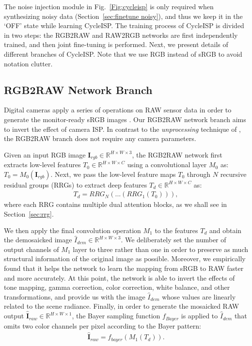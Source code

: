 \documentclass[10pt,twocolumn,letterpaper]{article}
\begin{document}
The noise injection module in Fig.~\ref{Fig:cycleisp} is only required when synthesizing noisy data (Section~\ref{sec:finetune noisy}), and thus we keep it in the `OFF' state while learning CycleISP. 
The training process of CycleISP is divided in two steps: the RGB2RAW and RAW2RGB networks are first independently trained, and then joint fine-tuning is performed. 
Next, we present details of different branches of CycleISP. 
Note that we use RGB instead of sRGB to avoid notation clutter.

\subsection{RGB2RAW Network Branch}
Digital cameras apply a series of operations on RAW sensor data in order to generate the monitor-ready sRGB images \cite{Ramanath2005}. 
Our RGB2RAW network branch aims to invert the effect of camera ISP. 
In contrast to the \emph{unprocessing} technique of \cite{Brooks2019}, the RGB2RAW branch does not require any camera parameters.  

Given an input RGB image $\mathbf{I}_{rgb} \in \mathbb{R}^{H\times W \times 3}$, the RGB2RAW network first extracts low-level features $T_0\in \mathbb{R}^{H\times W \times C}$ using a convolutional layer $M_0$ as: $T_0 = M_0(\mathbf{I}_{rgb}).$ 
Next, we pass the low-level feature maps $T_0$ through $N$ recursive residual groups (RRGs) to extract deep features $T_d \in \mathbb{R}^{H\times W \times C}$ as:
\begin{align}
T_d = RRG_{N}\left(...(RRG_1(T_0))\right),
\label{Eq:rrg}
\end{align}
where each RRG contains multiple dual attention blocks, as we shall see in Section~\ref{sec:rrg}. 

We then apply the final convolution operation $M_1$ to the features $T_d$ and obtain the demosaicked image $\hat{I}_{dem} \in \mathbb{R}^{H\times W \times 3}$.
We deliberately set the number of output channels of $M_1$ layer to three rather than one in order to preserve as much structural information of the original image as possible. 
Moreover, we empirically found that it helps the network to learn the mapping from sRGB to RAW faster and more accurately. 
At this point, the network is able to invert the effects of tone mapping, gamma correction, color correction, white balance, and other transformations, and provide us with the image $\hat{I}_{dem}$ whose values are linearly related to the scene radiance. 
Finally, in order to generate the mosaicked RAW output $\hat{\mathbf{I}}_{raw}\in \mathbb{R}^{H\times W \times 1}$, the Bayer sampling function $f_{Bayer}$ is applied to $\hat{I}_{dem}$ that omits two color channels per pixel according to the  Bayer pattern: 
\begin{align}
\hat{\mathbf{I}}_{raw} = f_{bayer}(M_1(T_d)).
\label{Eq:raw}
\end{align}
\end{document}
